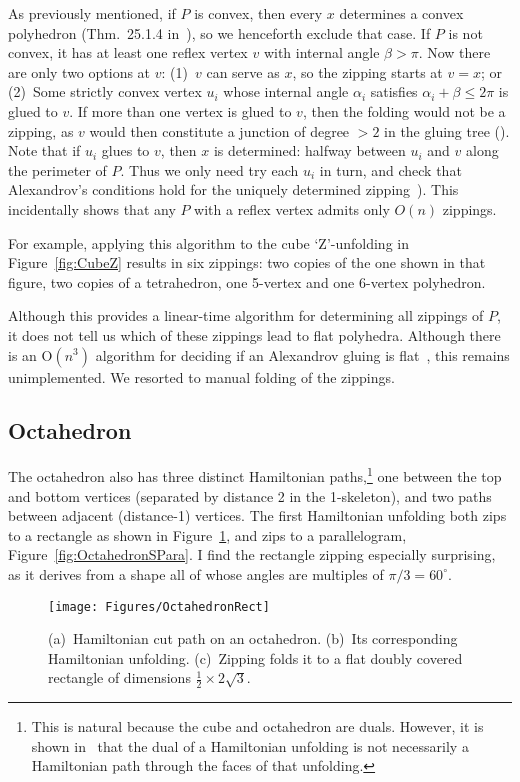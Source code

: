 \pdfoutput=1  \documentclass[]{article}
\newcommand{\figlab}[1]{\label{fig:#1}}
\newcommand{\figref}[1]{\ref{fig:#1}}
\def\a{{\alpha}}
\def\b{{\beta}}
\begin{document}
As previously mentioned, if $P$ is convex, then every $x$ determines a
convex polyhedron (Thm.~25.1.4 in~\cite{do-gfalop-07}), so we henceforth exclude that case.
If $P$ is not convex, it has at least one reflex vertex $v$ with
internal angle $\b > \pi$.
Now there are only two options at $v$:
(1)~$v$ can serve as $x$, so the zipping starts at $v=x$; or
(2)~Some strictly convex vertex $u_i$ whose internal angle $\a_i$
satisfies $\a_i + \b \le 2 \pi$ is glued to $v$.
If more than one vertex is glued to $v$, then the folding would not be
a zipping, as $v$ would then constitute a junction of degree $> 2$
in the gluing tree (\cite[Sec.~25.3]{do-gfalop-07}).
Note that if $u_i$ glues to $v$, then $x$ is determined: halfway between $u_i$
and $v$ along the perimeter of $P$.
Thus we only need try each $u_i$ in turn, and check that
Alexandrov's conditions hold for the uniquely determined zipping~\cite[Thm.~23.3.1]{do-gfalop-07}).
This incidentally shows that any $P$ with a reflex vertex admits
only $O(n)$ zippings.

For example, applying this algorithm to the cube `Z'-unfolding
in Figure~\figref{CubeZ} results in six zippings: two copies of the
one shown in that figure, two copies of a tetrahedron, one
5-vertex and one 6-vertex polyhedron.

Although this provides a linear-time algorithm for determining all
zippings of $P$, it does not tell us which of these zippings lead
to flat polyhedra.
Although there is an O$(n^3)$ algorithm for deciding if an
Alexandrov gluing is flat~\cite{o-ofpat-10}, this remains
unimplemented.
We resorted to manual folding of the zippings.

\subsection{Octahedron}
The octahedron also has three distinct Hamiltonian paths,\footnote{
   This is natural because the cube and octahedron are duals.
   However, it is shown in~\cite[Fig.~4]{lddss-zupc-10}
   that the dual of a Hamiltonian unfolding is not necessarily
   a Hamiltonian path through the faces of that unfolding.
}
one between
the top and bottom vertices (separated by distance 2 in the
1-skeleton), and two paths between adjacent (distance-1) vertices.
The first Hamiltonian unfolding both zips to a rectangle as shown
in Figure~\figref{OctahedronRect},
and zips to a parallelogram, Figure~\figref{OctahedronSPara}.
I find the rectangle zipping especially surprising, as it derives from
a shape all of whose angles are multiples of $\pi/3=60^\circ$.
\begin{figure}[htbp]
\centering
\texttt{[image: Figures/OctahedronRect]}
\caption{(a)~Hamiltonian cut path on an octahedron.
(b)~Its corresponding Hamiltonian unfolding.
(c)~Zipping folds it to
a flat doubly covered rectangle
of dimensions $\frac{1}{2} \times 2\sqrt{3}$.}
\figlab{OctahedronRect}
\end{figure}
\end{document}
